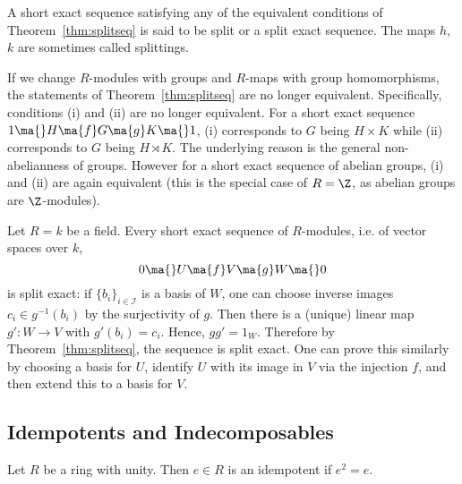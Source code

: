 \begin{dfn}
A short exact sequence satisfying any of the equivalent conditions of Theorem~\ref{thm:splitseq} is said to be split or a split exact sequence. The maps $h$, $k$ are sometimes called splittings.
\end{dfn}


\begin{rem}
If we change $R$-modules with groups and $R$-maps with group homomorphisms, the statements of Theorem~\ref{thm:splitseq} are no longer equivalent. Specifically, conditions (i) and (ii) are no longer equivalent. For a short exact sequence $1 \ma{} H \ma{f} G \ma{g} K \ma{} 1$, (i) corresponds to $G$ being $H \times K$ while (ii) corresponds to $G$ being $H \rtimes K$. The underlying reason is the general non-abelianness of groups. However for a short exact sequence of abelian groups, (i) and (ii) are again equivalent (this is the special case of $R=\Z$, as abelian groups are $\Z$-modules). 
\end{rem}


\begin{ex}
Let $R=k$ be a field. Every short exact sequence of $R$-modules, i.e. of vector spaces over $k$, 
	\[
	0 \ma{} U \ma{f} V \ma{g} W \ma{} 0
	\]
is split exact: if $\{b_i\}_{i \in \mathcal{I}}$ is a basis of $W$, one can choose inverse images $c_i \in g^{-1}(b_i)$ by the surjectivity of $g$. Then there is a (unique) linear map $g': W \to V$ with $g'(b_i)=c_i$. Hence, $gg'=1_W$. Therefore by Theorem~\ref{thm:splitseq}, the sequence is split exact. One can prove this similarly by choosing a basis for $U$, identify $U$ with its image in $V$ via the injection $f$, and then extend this to a basis for $V$. \xqed
\end{ex}



\subsection{Idempotents and Indecomposables}



\begin{dfn}[Idempotent]
Let $R$ be a ring with unity. Then $e \in R$ is an idempotent if $e^2=e$. 
\end{dfn}


